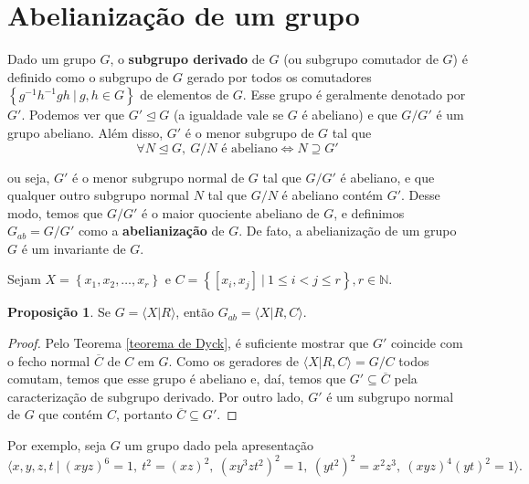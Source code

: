 \documentclass[a4paper,portuguese,11pt,twoside, leqno]{book}
\theoremstyle{definition}
\newtheorem{prop}{Proposição}[section]
\begin{document}
	\section{Abelianização de um grupo}
	\hspace{12pt} Dado um grupo $G$, o \textbf{subgrupo derivado} de $G$ (ou subgrupo comutador de $G$) é definido como o subgrupo de $G$ gerado por todos os comutadores $\left\{ g^{-1}h^{-1}gh \ | \ g,h\in G \right\}$ de elementos de $G$. Esse grupo é geralmente denotado por $G'$. Podemos ver que $G'\trianglelefteq G$ (a igualdade vale se $G$ é abeliano) e que $G/G'$ é um grupo abeliano. Além disso, $G'$ é o menor subgrupo de $G$ tal que
	\begin{equation*}
	\forall N\trianglelefteq G, \ G/N \text{ é abeliano} \iff N\supseteq
	G'\end{equation*}
	\par\vspace{0.3cm} ou seja, $G'$ é o menor subgrupo normal de $G$ tal que $G/G'$ é abeliano, e que qualquer outro subgrupo normal $N$ tal que $G/N$ é abeliano contém $G'$. Desse modo, temos que $G/G'$ é o maior quociente abeliano de $G$, e definimos $G_{ab} = G/G'$ como a \textbf{abelianização} de $G$. De fato, a abelianização de um grupo $G$ é um invariante de $G$.
	\par\vspace{0.3cm} Sejam  $X = \left\{ x_1, x_2, \dots, x_r \right\}$ e $C = \left\{ [x_i, x_j] \ | \ 1\leq i < j \leq r \right\}, r\in\mathbb{N}$.
	\begin{prop}
		\label{apresentacao abelianizacao}
		Se $G = \langle X|R \rangle$, então $G_{ab} = \langle X|R,C \rangle$.
	\end{prop}
	\begin{proof}
		Pelo Teorema \eqref{teorema de Dyck}, é suficiente mostrar que $G'$ coincide com o fecho normal $\overline{C}$ de $C$ em $G$. Como os geradores de $\langle X|R,C \rangle = G/C$ todos comutam, temos que esse grupo é abeliano e, daí, temos que $G'\subseteq \overline{C}$ pela caracterização de subgrupo derivado. Por outro lado, $G'$ é um subgrupo normal de $G$ que contém $C$, portanto $\overline{C}\subseteq G'$.
	\end{proof}
	\par\vspace{0.3cm} Por exemplo, seja $G$ um grupo dado pela apresentação
	\begin{equation*}
	\langle x,y,z,t \ | \ (xyz)^6 = 1, \ t^2 = (xz)^2, \ (xy^3zt^2)^2 = 1, \ (yt^2)^2 = x^2z^3, \ (xyz)^4(yt)^2 = 1 \rangle.
	\end{equation*}
\end{document}
